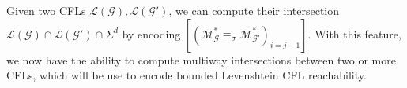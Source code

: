 \documentclass[sigplan,review,anonymous,acmsmall]{acmart}\settopmatter{printfolios=false,printccs=false,printacmref=false}
\begin{document}

Given two CFLs $\mathcal{L}(\mathcal{G}), \mathcal{L}(\mathcal{G}')$, we can compute their intersection $\mathcal{L}(\mathcal{G})\cap\mathcal{L}(\mathcal{G}')\cap\Sigma^d$ by encoding $\left[(\mathcal{M}_{\mathcal{G}}^* \equiv_\sigma \mathcal{M}_{\mathcal{G}'}^*)_{i=j-1}\right]$. With this feature, we now have the ability to compute multiway intersections between two or more CFLs, which will be use to encode bounded Levenshtein CFL reachability.



\end{document}

